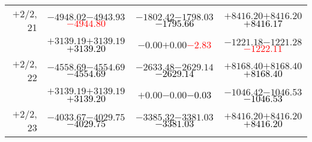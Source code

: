 \documentclass[compress]{beamer}
\begin{document}
\begin{frame}
{\begin{tabular}{r | c | c | c}
$+$2/2, 21 & $-4948.02$\hspace{0.1 cm}$-4943.93$\hspace{0.1 cm}\textcolor{red}{$-4944.80$} & $-1802.42$\hspace{0.1 cm}$-1798.03$\hspace{0.1 cm}\textcolor{black}{$-1795.66$} & $+8416.20$\hspace{0.1 cm}$+8416.20$\hspace{0.1 cm}\textcolor{black}{$+8416.17$} \\
           & $+3139.19$\hspace{0.1 cm}$+3139.19$\hspace{0.1 cm}\textcolor{black}{$+3139.20$} & $-0.00$\hspace{0.1 cm}$+0.00$\hspace{0.1 cm}\textcolor{red}{$-2.83$} & $-1221.18$\hspace{0.1 cm}$-1221.28$\hspace{0.1 cm}\textcolor{red}{$-1222.11$} \\
$+$2/2, 22 & $-4558.69$\hspace{0.1 cm}$-4554.69$\hspace{0.1 cm}\textcolor{black}{$-4554.69$} & $-2633.48$\hspace{0.1 cm}$-2629.14$\hspace{0.1 cm}\textcolor{black}{$-2629.14$} & $+8168.40$\hspace{0.1 cm}$+8168.40$\hspace{0.1 cm}\textcolor{black}{$+8168.40$} \\
           & $+3139.19$\hspace{0.1 cm}$+3139.19$\hspace{0.1 cm}\textcolor{black}{$+3139.20$} & $+0.00$\hspace{0.1 cm}$-0.00$\hspace{0.1 cm}\textcolor{black}{$-0.03$} & $-1046.42$\hspace{0.1 cm}$-1046.53$\hspace{0.1 cm}\textcolor{black}{$-1046.53$} \\
$+$2/2, 23 & $-4033.67$\hspace{0.1 cm}$-4029.75$\hspace{0.1 cm}\textcolor{black}{$-4029.75$} & $-3385.32$\hspace{0.1 cm}$-3381.03$\hspace{0.1 cm}\textcolor{black}{$-3381.03$} & $+8416.20$\hspace{0.1 cm}$+8416.20$\hspace{0.1 cm}\textcolor{black}{$+8416.20$} \\

\end{tabular}}
\end{frame}
\end{document}
